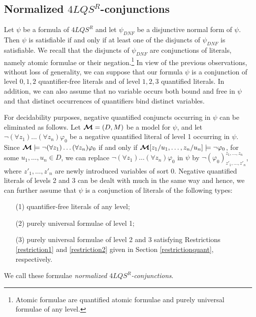 \documentclass{fundam}
\newcommand{\model}{\ensuremath{\mbox{\boldmath $\mathcal{M}$}}\xspace}
\newcommand{\QLQSR}{\ensuremath{\mbox{$4\mathit{LQS}^{R}$}}\xspace}
\begin{document}
\subsection{Normalized $\QLQSR$-conjunctions}\label{normal3LQS}
Let $\psi$ be a formula of $\QLQSR$ and let $\psi_{DNF}$ be a
disjunctive normal form of $\psi$.  Then $\psi$ is satisfiable if
and only if at least one of the disjuncts of $\psi_{DNF}$ is
satisfiable. We recall that the disjuncts of $\psi_{DNF}$ are
conjunctions of literals, namely atomic formulae or their negation.\footnote{Atomic formulae are
quantified atomic formulae and purely universal formulae of any level.}
In view of the previous observations,
without loss of generality, we can suppose that our formula $\psi$
is a conjunction of level $0,1,2$ quantifier-free literals and
of level $1,2,3$ quantified literals.  In addition, we
can also assume that no variable occurs both bound and free in $\psi$
and that distinct occurrences of quantifiers bind distinct
variables.

For decidability purposes, negative quantified conjuncts occurring in
$\psi$ can be eliminated as follows.  Let $\model = (D, M)$ be a model
for $\psi$, and let $\neg (\forall z_1) \ldots (\forall z_n)
\varphi_0$ be a negative quantified literal of level 1 occurring in
$\psi$.  Since $\model \models \neg (\forall z_1) \ldots (\forall z_n)
\varphi_0$ if and only if $\model[z_1/u_1,\ldots , z_n/u_n] \models
\neg \varphi_0$, for some $u_1,\ldots ,u_n \in D$, we can replace
$\neg (\forall z_1) \ldots (\forall z_n) \varphi_0$ in $\psi$ by $\neg
(\varphi_{0})^{z_{1},\ldots,z_{n}}_{z'_{1},\ldots,z'_{n}}$, where
$z'_{1},\ldots,z'_{n}$ are newly introduced variables of sort 0.
Negative quantified literals of levels 2 and 3 can be dealt with much
in the same way and hence, we can further assume that $\psi$ is a
conjunction of literals of the following types:



\begin{itemize}
\item[(1)] quantifier-free literals of any level;

\item[(2)] purely universal formulae of level 1;

\item[(3)] purely universal formulae of level 2 and 3 satisfying
Restrictions \ref{restriction1} and \ref{restriction2} given in
Section \ref{restrictionquant}, respectively.
\end{itemize}
We call these formulae {\em normalized $\QLQSR$-conjunctions}.
\end{document}
